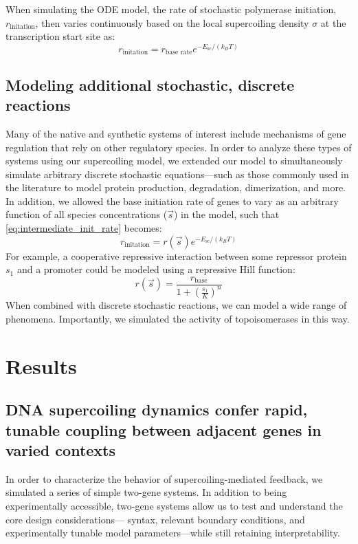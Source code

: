 \documentclass[11pt]{article}
\begin{document}
When simulating the ODE model, the rate of stochastic polymerase initiation, \(r_\text{initation}\), then varies continuously based on the local supercoiling density \(\sigma\) at the transcription start site as:
\begin{equation}
    r_\text{initation} = r_\text{base rate} e^{- E_\text{sc} / (k_B T)}
\label{eq:intermediate_init_rate}
\end{equation}


\subsection{Modeling additional stochastic, discrete reactions}
Many of the native and synthetic systems of interest include mechanisms of gene regulation that rely on other regulatory species. In order to analyze these types of systems using our supercoiling model, we extended our model to simultaneously simulate arbitrary discrete stochastic equations---such as those commonly used in the literature to model protein production, degradation, dimerization, and more.
In addition, we allowed the base initiation rate of genes to vary as an arbitrary function of all species concentrations (\(\vec s\)) in the model, such that \cref{eq:intermediate_init_rate} becomes:
\begin{equation}
    r_\text{initation} = r(\vec s) e^{- E_\text{sc} / (k_B T)}
\label{eq:final_init_rate}
\end{equation}
For example, a cooperative repressive interaction between some repressor protein \(s_1\) and a promoter could be modeled using a repressive Hill function:
\[
    r(\vec s) = \frac{r_\text{base}}{1 + \left(\frac{s_1}{K}\right)^n}
\]
When combined with discrete stochastic reactions, we can model a wide range of phenomena. Importantly, we simulated the activity of topoisomerases in this way.

\section{Results}

\subsection{DNA supercoiling dynamics confer rapid, tunable coupling between adjacent genes in varied contexts}
In order to characterize the behavior of supercoiling-mediated feedback, we simulated a series of simple two-gene systems. In addition to being experimentally accessible, two-gene systems allow us to test and understand the core design considerations--- syntax, relevant boundary conditions, and experimentally tunable model parameters---while still retaining interpretability.
\end{document}
